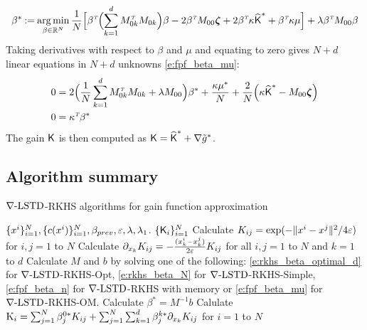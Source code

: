 \begin{equation}
\beta ^* \mathbin{:=}
\mathop{\rm arg{\,}min}_{\beta  \in \mathbb{R}^N} \frac{1}{N} \Bigl[  \beta ^{\hbox{\tiny\it T}} \Bigl( \sum_{k=1}^d M_{0k}^{\hbox{\tiny\it T}} M_{0k} \Bigr) \beta   - 2 \beta ^{\hbox{\tiny\it T}}  M_{00} \boldsymbol{\zeta} + 2 \beta ^{\hbox{\tiny\it T}} \kappa \widehat{\text{\sf K}}^* + \beta ^{\hbox{\tiny\it T}} \kappa \mu  \Bigr]+ \lambda \beta ^{\hbox{\tiny\it T}}  M_{00} \beta
\end{equation}
Taking derivatives with respect to $\beta $ and $\mu $ and equating to zero gives $N+d$ linear equations in $N+d$ unknowns \eqref{e:fpf_beta_mu}:
\begin{equation}
\begin{aligned}
0  &=  2 \Bigl(  \frac{1}{N}  \sum_{k=1}^d M_{0k}^\transpose M_{0k}   +  \lambda M_{00} \Bigr) \beta ^* + \frac{ \kappa \mu ^*}{N}+  \frac{2}{N} \Bigl( \kappa \hakFPF^*  -   M_{00} \boldsymbol{\zeta} \Bigr)  \\
0  & = \kappa^{\transpose} \beta^*
\label{e:fpf_beta_mu}
\end{aligned}
\end{equation}
The gain $\text{\sf K}$ is then computed as
$
\text{\sf K} = \widehat{\text{\sf K}}^* + \nabla \tilde g^*$.

\subsection{Algorithm summary}
\label{alg:rkhs}
\begin{algorithm}{$\nabla\text{-LSTD}$-RKHS algorithms for gain function approximation}
	\begin{algorithmic}[1]
		\Require $\{x^i\}_{i=1}^N, \{c(x^i)\}_{i=1}^N, \beta_{prev}, \varepsilon, \lambda, \lambda_1$.
		\Ensure $\{\text{\sf K}_i\}_{i=1}^N$
		\State Calculate $K_{ij} = \exp(-\|x^i - x^j\|^2/ 4\varepsilon)$ for $i,j = 1$ to $N$  
		\State Calculate $ \partial_{x_k}K_{ij} = -\frac{(x_k^i - x_k^j)}{2\varepsilon} K_{ij}$ for all $i,j =1$ to $N$ and $k = 1$ to $d$ 
		\State Calculate $M$ and $b$ by solving one of the following: \eqref{e:rkhs_beta_optimal_d} for $\nabla\text{-LSTD}$-RKHS-Opt, \eqref{e:rkhs_beta_N} for $\nabla\text{-LSTD}$-RKHS-Simple, \eqref{e:fpf_beta_n} for $\nabla\text{-LSTD}$-RKHS with memory or \eqref{e:fpf_beta_mu} for $\nabla\text{-LSTD}$-RKHS-OM.  
		\State Calculate $\beta^* = M^{-1}b$
		\State Calulate $\text{K}_i  =  \sum_{j=1}^N  \beta^{0*}_j K_{ij} + \sum_{j=1}^N \sum_{k=1}^d \beta^{k*}_j \partial_{x_k} K_{ij}$ for $i =1$ to $N$ 
	\end{algorithmic}
\end{algorithm} 

